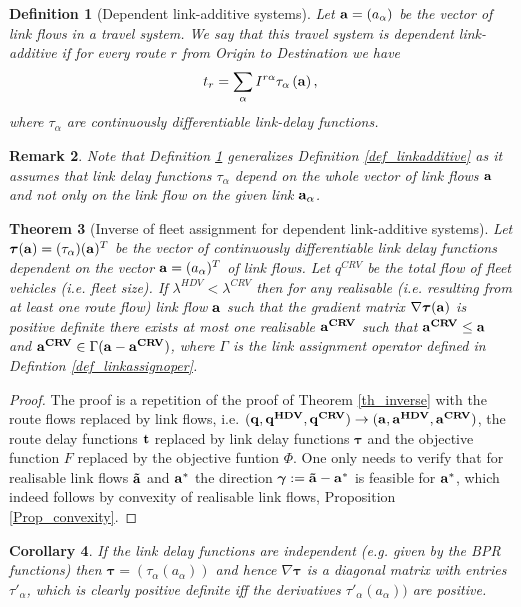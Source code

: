 \documentclass[a4paper,11pt]{article}
\newtheorem{theorem}{Theorem}
\newtheorem{definition}[theorem]{Definition}
\newtheorem{remark}[theorem]{Remark}
\newtheorem{corollary}[theorem]{Corollary}
\begin{document}
\begin{definition}[Dependent link-additive systems]
\label{def_deplinkadd}
Let $\bold{a} = (a_\alpha)$ be the vector of link flows in a travel system. We say that this travel system is \emph{dependent link-additive} if for every route $r$ from Origin to Destination we have
\begin{equation*}
t_r = \sum_{\alpha} I^{r\alpha} \tau_\alpha\left(\bold{a}\right),
\end{equation*}
where $\tau_\alpha$ are continuously differentiable link-delay functions. 
\end{definition}
\begin{remark}
Note that Definition \ref{def_deplinkadd} generalizes Definition \ref{def_linkadditive} as it assumes that link delay functions $\tau_\alpha$ depend on the whole vector of link flows $\bold{a}$ and not only on the link flow on the given link $\bold{a}_\alpha$. 
\end{remark}

\begin{theorem}[Inverse of fleet assignment for dependent link-additive systems]
\label{th_inverselinkadd}
Let $\boldsymbol{\tau}(\bold{a}) = (\tau_{\alpha})(\bold{a})^T$ be the vector of continuously differentiable link delay functions dependent on the vector $\bold{a} = (a_\alpha)^T$  of link flows. Let $q^{CRV}$ be the total flow of fleet vehicles (i.e. fleet size). If $\lambda^{HDV} <  \lambda^{CRV}$ then for any realisable (i.e. resulting from at least one route flow) link flow $\bold{a}$ such that the gradient matrix $\nabla \boldsymbol{\tau}(\bold{a})$ is positive definite there exists at most one realisable $\bold{a^{CRV}}$ such that $\bold{a^{CRV}} \le \bold{a}$ and 
$\bold{a^{CRV}} \in \Gamma(\bold{a} - \bold{a^{CRV}})$, where $\Gamma$ is the link assignment operator defined in Defintion \ref{def_linkassignoper}. 
\end{theorem}

\begin{proof}
The proof is a repetition of the proof of Theorem \ref{th_inverse} with the route flows replaced by link flows, i.e. $(\bold{q},\bold{q^{HDV}},\bold{q^{CRV}}) \to (\bold{a}, \bold{a^{HDV}}, \bold{a^{CRV}})$, the route delay functions $\bold{t}$ replaced by link delay functions $\boldsymbol{\tau}$ and the objective function $F$ replaced by the objective funtion $\Phi$. One only needs to verify that for  realisable link flows $\bold{\tilde{a}}$ and $\bold{a^*}$ the direction $\boldsymbol{\gamma}:= \bold{\tilde{a}} - \bold{a^*}$ is feasible for $\bold{a^*}$, which indeed follows by convexity of realisable link flows, Proposition \ref{Prop_convexity}.   
\end{proof}
\begin{corollary}
If the link delay functions are independent (e.g. given by the BPR functions) then $\boldsymbol{\tau}= (\tau_{\alpha}(a_\alpha))$ and hence
$\nabla \boldsymbol{\tau}$ is a diagonal matrix with entries $\tau'_\alpha$, which is clearly positive definite iff the derivatives $\tau'_\alpha(a_\alpha))$ are positive. 
\end{corollary}
\end{document}
